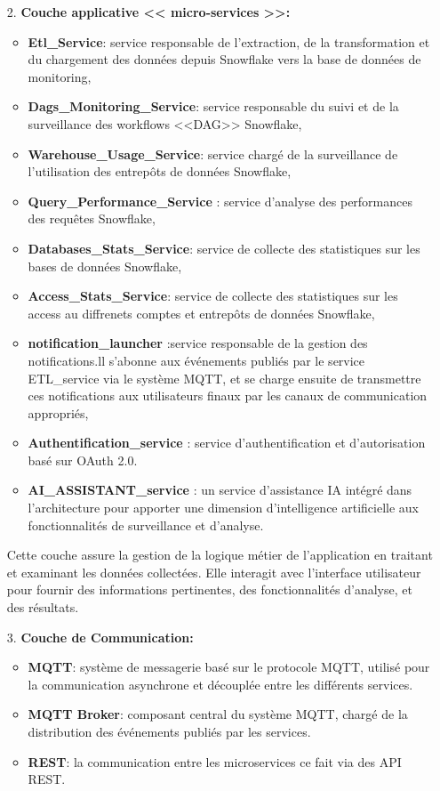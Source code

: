 \begin{enumerate}
         \item[2.] \textbf{Couche applicative << micro-services >>:}
                \begin{itemize}
                \item \textbf{Etl\_Service}: service responsable de l'extraction, de la transformation et du chargement des données depuis Snowflake vers la base de données de monitoring,
                \item \textbf{Dags\_Monitoring\_Service}: service responsable du suivi et de la surveillance des workflows <<DAG>> Snowflake,
                \item \textbf{Warehouse\_Usage\_Service}: service chargé de la surveillance de l'utilisation des entrepôts de données Snowflake,
                \item \textbf{Query\_Performance\_Service }: service d'analyse des performances des requêtes Snowflake,
                \item \textbf{Databases\_Stats\_Service}: service de collecte des statistiques sur les bases de données Snowflake,
                \item \textbf{Access\_Stats\_Service}: service de collecte des statistiques sur les access au diffrenets comptes et entrepôts de données Snowflake,
                \item \textbf{notification\_launcher }:service responsable de la gestion des notifications.ll s'abonne aux événements publiés par le service ETL\_service via le système MQTT, et se charge ensuite de transmettre ces notifications aux utilisateurs finaux par les canaux de communication appropriés,
                \item \textbf{Authentification\_service }: service d'authentification et d'autorisation basé sur OAuth 2.0.
                \item \textbf{AI\_ASSISTANT\_service }: un service d'assistance IA intégré dans l'architecture pour apporter une dimension d'intelligence artificielle aux fonctionnalités de surveillance et d'analyse.

            \end{itemize}
                \par Cette couche assure la gestion de la logique métier de l'application en traitant et examinant les données collectées.
                Elle interagit avec l'interface utilisateur pour fournir des informations pertinentes, des fonctionnalités d'analyse, et des résultats.
        \item[3.] \textbf{Couche de Communication: }
                \begin{itemize}
                    \item \textbf{MQTT}: système de messagerie basé sur le protocole MQTT, utilisé pour la communication asynchrone et découplée entre les différents services.
                    \item \textbf{MQTT Broker}: composant central du système MQTT, chargé de la distribution des événements publiés par les services.
                    \item \textbf{REST}: la communication entre les microservices ce fait via des API REST.
                \end{itemize}
            

\end{enumerate}

